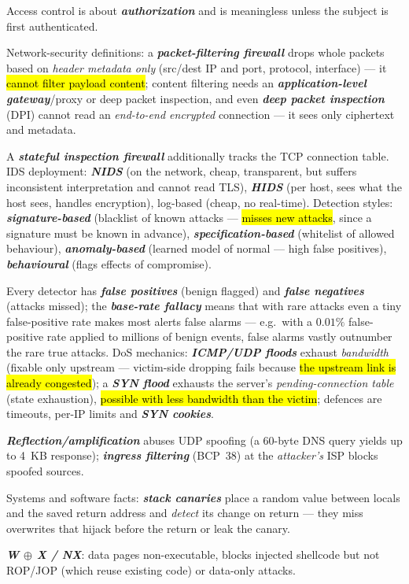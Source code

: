 \documentclass[12pt, a4paper]{article}
\newcommand{\term}[1]{\textbf{\textit{#1}}}        %
\newcommand{\imp}[1]{\hl{#1}}                       %
\begin{document}
Access control is about \term{authorization} and is meaningless unless the subject is first authenticated.

Network-security definitions: a \term{packet-filtering firewall} drops whole packets based on \emph{header metadata only} (src/dest IP and port, protocol, interface) --- it \imp{cannot filter payload content}; content filtering needs an \term{application-level gateway}/proxy or deep packet inspection, and even \term{deep packet inspection} (DPI) cannot read an \emph{end-to-end encrypted} connection --- it sees only ciphertext and metadata.

A \term{stateful inspection firewall} additionally tracks the TCP connection table. IDS deployment: \term{NIDS} (on the network, cheap, transparent, but suffers inconsistent interpretation and cannot read TLS), \term{HIDS} (per host, sees what the host sees, handles encryption), log-based (cheap, no real-time).
Detection styles: \term{signature-based} (blacklist of known attacks --- \imp{misses new attacks}, since a signature must be known in advance), \term{specification-based} (whitelist of allowed behaviour), \term{anomaly-based} (learned model of normal --- high false positives), \term{behavioural} (flags effects of compromise).

Every detector has \term{false positives} (benign flagged) and \term{false negatives} (attacks missed); the \term{base-rate fallacy} means that with rare attacks even a tiny false-positive rate makes most alerts false alarms --- e.g.\ with a $0.01\%$ false-positive rate applied to millions of benign events, false alarms vastly outnumber the rare true attacks.
DoS mechanics: \term{ICMP/UDP floods} exhaust \emph{bandwidth} (fixable only upstream --- victim-side dropping fails because \imp{the upstream link is already congested}); a \term{SYN flood} exhausts the server's \emph{pending-connection table} (state exhaustion), \imp{possible with less bandwidth than the victim}; defences are timeouts, per-IP limits and \term{SYN cookies}.

\term{Reflection/amplification} abuses UDP spoofing (a 60-byte DNS query yields up to 4~KB response); \term{ingress filtering} (BCP~38) at the \emph{attacker's} ISP blocks spoofed sources.

Systems and software facts: \term{stack canaries} place a random value between locals and the saved return address and \emph{detect} its change on return --- they miss overwrites that hijack before the return or leak the canary.

\term{W $\oplus$ X / NX}: data pages non-executable, blocks injected shellcode but not ROP/JOP (which reuse existing code) or data-only attacks.
\end{document}
